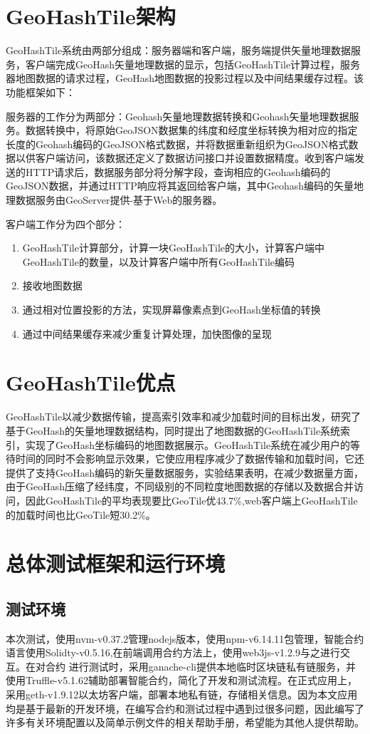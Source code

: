 \section{GeoHashTile架构}
GeoHashTile系统由两部分组成：服务器端和客户端，服务端提供矢量地理数据服务，客户端完成GeoHash矢量地理数据的显示，包括GeoHashTile计算过程，服务器地图数据的请求过程，GeoHash地图数据的投影过程以及中间结果缓存过程\cite{zhou2020geohashtile}。该功能框架如下：

服务器的工作分为两部分：Geohash矢量地理数据转换和Geohash矢量地理数据服务。数据转换中，将原始GeoJSON数据集的纬度和经度坐标转换为相对应的指定长度的Geohash编码的GeoJSON格式数据，并将数据重新组织为GeoJSON格式数据以供客户端访问，该数据还定义了数据访问接口并设置数据精度。收到客户端发送的HTTP请求后，数据服务部分将分解字段，查询相应的Geohash编码的GeoJSON数据，并通过HTTP响应将其返回给客户端，其中Geohash编码的矢量地理数据服务由GeoServer提供-基于Web的服务器。

客户端工作分为四个部分：
\begin{enumerate}
    \item GeoHashTile计算部分，计算一块GeoHashTile的大小，计算客户端中GeoHashTile的数量，以及计算客户端中所有GeoHashTile编码
    \item 接收地图数据
    \item 通过相对位置投影的方法，实现屏幕像素点到GeoHash坐标值的转换
    \item 通过中间结果缓存来减少重复计算处理，加快图像的呈现
\end{enumerate}

\section{GeoHashTile优点}
GeoHashTile以减少数据传输，提高索引效率和减少加载时间的目标出发，研究了基于GeoHash的矢量地理数据结构，同时提出了地图数据的GeoHashTile系统索引，实现了GeoHash坐标编码的地图数据展示。GeoHashTile系统在减少用户的等待时间的同时不会影响显示效果，它使应用程序减少了数据传输和加载时间，它还提供了支持GeoHash编码的新矢量数据服务，实验结果表明，在减少数据量方面，由于GeoHash压缩了经纬度，不同级别的不同粒度地图数据的存储以及数据合并访问，因此GeoHashTile的平均表现要比GeoTile优43.7\%,web客户端上GeoHashTile的加载时间也比GeoTile短30.2\%。

\section{总体测试框架和运行环境}
\subsection{测试环境}
本次测试，使用nvm-v0.37.2管理nodejs版本，使用npm-v6.14.11包管理，智能合约语言使用Solidty-v0.5.16,在前端调用合约方法上，使用web3js-v1.2.9与之进行交互。在对合约 进行测试时，采用ganache-cli提供本地临时区块链私有链服务，并使用Truffle-v5.1.62辅助部署智能合约，简化了开发和测试流程。在正式应用上，采用geth-v1.9.12以太坊客户端，部署本地私有链，存储相关信息。因为本文应用均是基于最新的开发环境，在编写合约和测试过程中遇到过很多问题，因此编写了许多有关环境配置以及简单示例文件的相关帮助手册，希望能为其他人提供帮助。

